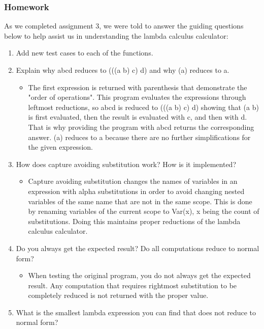 \documentclass{article}
\theoremstyle{theorem}
\theoremstyle{definition}
\theoremstyle{remark}
\begin{document}
\subsubsection*{Homework}
As we completed assignment 3, we were told to answer the guiding questions below to help assist us in
understanding the lambda calculus calculator:
\begin{enumerate}
  \item Add new test cases to each of the functions.
  \item Explain why abcd reduces to (((a b) c) d) and why (a) reduces to a.
    \begin{itemize}
      \item The first expression is returned with parenthesis that demonstrate the "order of operations". This
      program evaluates the expressions through leftmost reductions, so abcd is reduced to (((a b) c) d) showing
      that (a b) is first evaluated, then the result is evaluated with c, and then with d. That is why providing the
      program with abcd returns the corresponding answer. (a) reduces to a because there are no further simplifications
      for the given expression.
    \end{itemize}
    \item How does capture avoiding substitution work? How is it implemented?
    \begin{itemize}
      \item Capture avoiding substitution changes the names of variables in an expression with
      alpha substitutions in order to avoid changing nested variables of the same name that are not 
      in the same scope. This is done by renaming variables of the current scope to Var(x), x 
      being the count of substitutions. Doing this maintains proper reductions of the lambda 
      calculus calculator.
    \end{itemize}
    \item Do you always get the expected result? Do all computations reduce to normal form?
    \begin{itemize}
      \item When testing the original program, you do not always get the expected result.
      Any computation that requires rightmost substitution to be completely reduced is not returned 
      with the proper value. 
    \end{itemize}
    \item What is the smallest lambda expression you can find that does not reduce to normal form?
    \begin{lstlisting}

\end{lstlisting}
\end{enumerate}
\end{document}

